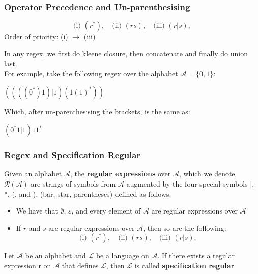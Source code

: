 \documentclass[hyperref={pdfpagemode=UseThumbs, pdfpagelayout=SinglePage, bookmarks=true, },handout,xcolor=dvipsnames]{beamer}
\newcommand{\alphabet}{\mathcal{A}}
\newcommand{\aLanguage}{\mathcal{L}}
\begin{document}
\begin{frame}
\frametitle{Operator Precedence and Un-parenthesising}

\begin{definition}
    $$\text{(i) } (r^*), \quad \text{(ii) } (rs), \quad \text{(iii) } (r|s),$$
    Order of priority: (i) $\rightarrow$ (iii)
\end{definition}
In any regex, we first do kleene closure, then concatenate and finally do union last.
\\[1em]
For example, take the following regex over the alphabet $\alphabet = \{0,1\}$:

\begin{center}
    $((((0^*)1)|1)(1(1)^*))$
\end{center}

Which, after un-parenthesising the brackets, is the same as:

\begin{center}
    $(0^*1|1)11^*$
\end{center}

\end{frame}
\begin{frame}
\frametitle{Regex and Specification Regular}
\begin{definition}
    Given an alphabet $\alphabet$, the \textbf{regular expressions} over $\alphabet$, which we denote $\mathcal{R}(\alphabet)$ are strings of symbols from $\alphabet$ augmented by the four special symbols $|$, *, (, and ), (bar, star, parentheses) defined as follows:
    \begin{itemize}
    \item<2-> We have that $\emptyset$, $\varepsilon$, and every element of $\alphabet$ are regular expressions over $\alphabet$
    \item<3-> If $r$ and $s$ are regular expressions over $\alphabet$, then so are the following:
    $$\text{(i) } (r^*), \quad \text{(ii) } (rs), \quad \text{(iii) } (r|s),$$
    \end{itemize}
\end{definition}

\begin{definition}
    Let $\alphabet$ be an alphabet and $\aLanguage$ be a language on $\alphabet$. If there exists a regular expression r on $\alphabet$ that defines $\aLanguage$, then $\aLanguage$ is called \textbf{specification regular}
\end{definition}

\end{frame}
\end{document}
